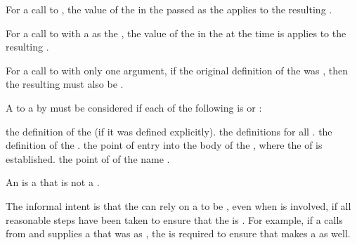 \itemitem{\bull}
For a call to , the value of the
  in the 
 passed as the   applies 
to the resulting .

\itemitem{\bull}
For a call to  with a  as the
, the value of the  
in the  at the time  is 
applies to the resulting .

\itemitem{\bull}
For a call to  with only one argument, if the original definition
of the  was , then the resulting 
must also be .

\itemitem{\bull}
A  to a  by  must be 
considered  if each of the following is 
 or :

\beginlist
\itemitem{--} the definition of the  (if it was defined explicitly).
\itemitem{--} the  definitions for all  .
\itemitem{--} the definition of the .
\itemitem{--} the point of entry into the body of the ,
	      where the  of  is established.
\itemitem{--} the point of  of the name .
\endlist

\endlist

An  is a  that is not a .

The informal intent is that the  can rely on a 
to be , even when  is involved, if all reasonable
steps have been taken to ensure that the  is .
For example, if a  calls  from 
 and supplies a  that was  
as , the  is required to ensure that
 makes a  as well.

